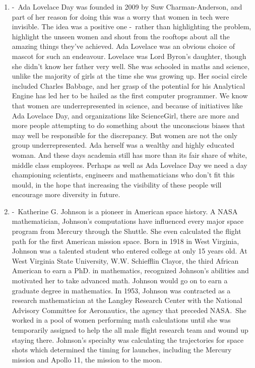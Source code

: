 \documentclass[12pt,a4paper]{article}
\begin{document}
\begin{enumerate}
    \item {} -\ Ada Lovelace Day was founded in 2009 by Suw Charman-Anderson, and part of her reason for doing this was a worry that women in tech were invisible. The idea was a positive one -\ rather than highlighting the problem, highlight the unseen women and shout from the rooftops about all the amazing things they’ve achieved. Ada Lovelace was an obvious choice of mascot for such an endeavour. Lovelace was Lord Byron’s daughter, though she didn’t know her father very well. She was schooled in maths and science, unlike the majority of girls at the time she was growing up. Her social circle included Charles Babbage, and her grasp of the potential for his Analytical Engine has led her to be hailed as the first computer programmer. We know that women are underrepresented in science, and because of initiatives like Ada Lovelace Day, and organizations like ScienceGirl, there are more and more people attempting to do something about the unconscious biases that may well be responsible for the discrepancy. But women are not the only group underrepresented. Ada herself was a wealthy and highly educated woman. And these days academia still has more than its fair share of white, middle class employees. Perhaps as well as Ada Lovelace Day we need a day championing scientists, engineers and mathematicians who don’t fit this mould, in the hope that increasing the visibility of these people will encourage more diversity in future. \href{https://www.theguardian.com/science/sifting-the-evidence/2015/oct/13/why-ada-lovelace-day-matters}{}
    \item {} -\ Katherine G. Johnson is a pioneer in American space history. A NASA mathematician, Johnson's computations have influenced every major space program from Mercury through the Shuttle. She even calculated the flight path for the first American mission space. Born in 1918 in West Virginia, Johnson was a talented student who entered college at only 15 years old. At West Virginia State University, W.W. Schiefflin Clayor, the third African American to earn a PhD. in mathematics, recognized Johnson's abilities and motivated her to take advanced math. Johnson would go on to earn a graduate degree in mathematics. In 1953, Johnson was contracted as a research mathematician at the Langley Research Center with the National Advisory Committee for Aeronautics, the agency that preceded NASA.\ She worked in a pool of women performing math calculations until she was temporarily assigned to help the all male flight research team and wound up staying there. Johnson's specialty was calculating the trajectories for space shots which determined the timing for launches, including the Mercury mission and Apollo 11, the mission to the moon.

\end{enumerate}
\end{document}
